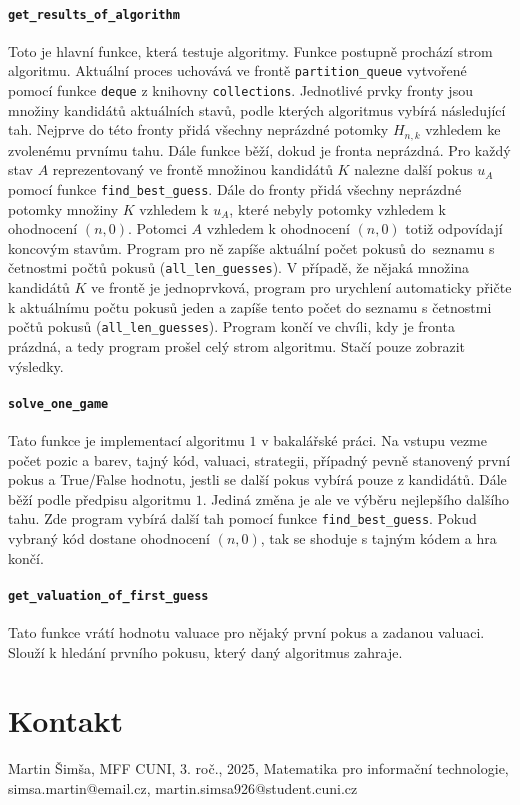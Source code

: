 \documentclass[12pt,a4paper]{article}
\begin{document}
\paragraph{\texttt{get\_results\_of\_algorithm}}
Toto je hlavní funkce, která testuje algoritmy. Funkce postupně prochází strom algoritmu. Aktuální proces uchovává ve frontě \texttt{partition\_queue} vytvořené pomocí funkce \texttt{deque} z knihovny \texttt{collections}. Jednotlivé prvky fronty jsou množiny kandidátů aktuálních stavů, podle kterých algoritmus vybírá následující tah. Nejprve do této fronty přidá všechny neprázdné potomky $H_{n,k}$ vzhledem ke zvolenému prvnímu tahu. Dále funkce běží, dokud je fronta neprázdná. Pro každý stav $A$ reprezentovaný ve frontě množinou kandidátů $K$ nalezne další pokus $u_A$ pomocí funkce \texttt{find\_best\_guess}. Dále do fronty přidá všechny neprázdné potomky množiny $K$ vzhledem k $u_A$, které nebyly potomky vzhledem k ohodnocení $(n,0)$. Potomci $A$ vzhledem k ohodnocení $(n,0)$ totiž odpovídají koncovým stavům. Program pro ně zapíše aktuální počet pokusů do~seznamu s četnostmi počtů pokusů (\texttt{all\_len\_guesses}). V případě, že nějaká množina kandidátů $K$ ve frontě je jednoprvková, program pro urychlení automaticky přičte k aktuálnímu počtu pokusů jeden a zapíše tento počet do seznamu s četnostmi počtů pokusů (\texttt{all\_len\_guesses}). Program končí ve chvíli, kdy je fronta prázdná, a tedy program prošel celý strom algoritmu. Stačí pouze zobrazit výsledky. 




\paragraph{\texttt{solve\_one\_game}}
Tato funkce je implementací algoritmu $1$ v bakalářské práci. Na vstupu vezme počet pozic a barev, tajný kód, valuaci, strategii, případný pevně stanovený první pokus a True/False hodnotu, jestli se další pokus vybírá pouze z kandidátů. Dále běží podle předpisu algoritmu $1$. Jediná změna je ale ve výběru nejlepšího dalšího tahu. Zde program vybírá další tah pomocí funkce \texttt{find\_best\_guess}. Pokud vybraný kód dostane ohodnocení $(n,0)$, tak se shoduje s tajným kódem a hra končí. 


\paragraph{\texttt{get\_valuation\_of\_first\_guess}}
Tato funkce vrátí hodnotu valuace pro nějaký první pokus a zadanou valuaci. Slouží k hledání prvního pokusu, který daný algoritmus zahraje.


\section{Kontakt}
Martin Šimša, MFF CUNI, 3. roč., 2025, Matematika pro informační technologie, simsa.martin@email.cz, martin.simsa926@student.cuni.cz
\end{document}
